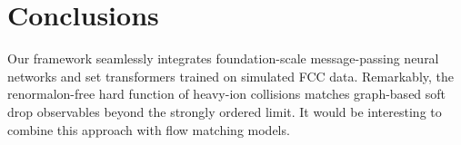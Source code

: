\section{Conclusions}\label{sec:conclusions}

Our framework seamlessly integrates foundation-scale message-passing
neural networks and set transformers trained on simulated FCC data.
Remarkably, the renormalon-free hard function of heavy-ion collisions
matches graph-based soft drop observables beyond the strongly ordered
limit. It would be interesting to combine this approach with flow
matching models.

